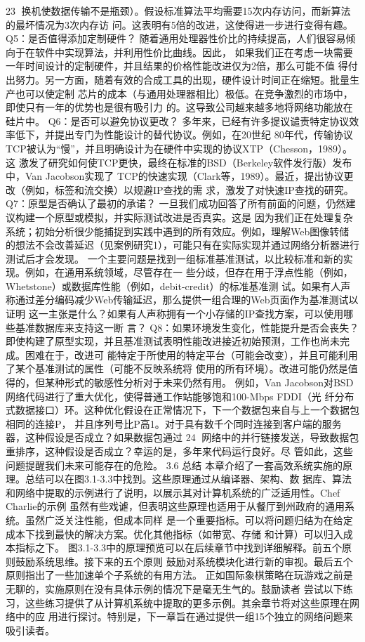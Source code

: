                                                   23
换机使数据传输不是瓶颈）。假设标准算法平均需要15次内存访问，而新算法的最坏情况为3次内存访
问。这表明有5倍的改进，这使得进一步进行变得有趣。
Q5：是否值得添加定制硬件？
随着通用处理器性价比的持续提高，人们很容易倾向于在软件中实现算法，并利用性价比曲线。因此，
如果我们正在考虑一块需要一年时间设计的定制硬件，并且结果的价格性能改进仅为2倍，那么可能不值
得付出努力。另一方面，随着有效的合成工具的出现，硬件设计时间正在缩短。批量生产也可以使定制
芯片的成本（与通用处理器相比）极低。在竞争激烈的市场中，即使只有一年的优势也是很有吸引力
的。这导致公司越来越多地将网络功能放在硅片中。
Q6：是否可以避免协议更改？
多年来，已经有许多提议谴责特定协议效率低下，并提出专门为性能设计的替代协议。例如，在20世纪
80年代，传输协议TCP被认为“慢”，并且明确设计为在硬件中实现的协议XTP（Chesson，1989）。这
激发了研究如何使TCP更快，最终在标准的BSD（Berkeley软件发行版）发布中，Van Jacobson实现了
TCP的快速实现（Clark等，1989）。最近，提出协议更改（例如，标签和流交换）以规避IP查找的需
求，激发了对快速IP查找的研究。
Q7：原型是否确认了最初的承诺？
一旦我们成功回答了所有前面的问题，仍然建议构建一个原型或模拟，并实际测试改进是否真实。这是
因为我们正在处理复杂系统；初始分析很少能捕捉到实践中遇到的所有效应。例如，理解Web图像转储
的想法不会改善延迟（见案例研究1），可能只有在实际实现并通过网络分析器进行测试后才会发现。
一个主要问题是找到一组标准基准测试，以比较标准和新的实现。例如，在通用系统领域，尽管存在一
些分歧，但存在用于浮点性能（例如，Whetstone）或数据库性能（例如，debit-credit）的标准基准测
试。如果有人声称通过差分编码减少Web传输延迟，那么提供一组合理的Web页面作为基准测试以证明
这一主张是什么？如果有人声称拥有一个小存储的IP查找方案，可以使用哪些基准数据库来支持这一断
言？
Q8：如果环境发生变化，性能提升是否会丧失？
即使构建了原型实现，并且基准测试表明性能改进接近初始预测，工作也尚未完成。困难在于，改进可
能特定于所使用的特定平台（可能会改变），并且可能利用了某个基准测试的属性（可能不反映系统将
使用的所有环境）。改进可能仍然是值得的，但某种形式的敏感性分析对于未来仍然有用。
例如，Van Jacobson对BSD网络代码进行了重大优化，使得普通工作站能够饱和100-Mbps FDDI（光
纤分布式数据接口）环。这种优化假设在正常情况下，下一个数据包来自与上一个数据包相同的连接P，
并且序列号比P高1。对于具有数千个同时连接到客户端的服务器，这种假设是否成立？如果数据包通过
                                                        24
网络中的并行链接发送，导致数据包重排序，这种假设是否成立？幸运的是，多年来代码运行良好。尽
管如此，这些问题提醒我们未来可能存在的危险。
3.6 总结
本章介绍了一套高效系统实施的原理。总结可以在图3.1-3.3中找到。这些原理通过从编译器、架构、数
据库、算法和网络中提取的示例进行了说明，以展示其对计算机系统的广泛适用性。Chef Charlie的示例
虽然有些戏谑，但表明这些原理也适用于从餐厅到州政府的通用系统。虽然广泛关注性能，但成本同样
是一个重要指标。可以将问题归结为在给定成本下找到最快的解决方案。优化其他指标（如带宽、存储
和计算）可以归入成本指标之下。
图3.1-3.3中的原理预览可以在后续章节中找到详细解释。前五个原则鼓励系统思维。接下来的五个原则
鼓励对系统模块化进行新的审视。最后五个原则指出了一些加速单个子系统的有用方法。
正如国际象棋策略在玩游戏之前是无聊的，实施原则在没有具体示例的情况下是毫无生气的。鼓励读者
尝试以下练习，这些练习提供了从计算机系统中提取的更多示例。其余章节将对这些原理在网络中的应
用进行探讨。特别是，下一章旨在通过提供一组15个独立的网络问题来吸引读者。


